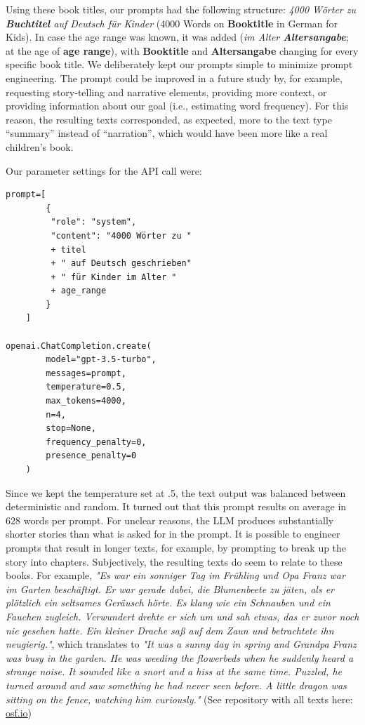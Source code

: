 \documentclass[doc, a4paper]{apa7}
\begin{document}
Using these book titles, our prompts had the following structure: \textit{4000 Wörter zu \textbf{Buchtitel} auf Deutsch für Kinder} (4000 Words on \textbf{Booktitle} in German for Kids). In case the age range was known, it was added (\textit{im Alter \textbf{Altersangabe}}; at the age of \textbf{age range}), with \textbf{Booktitle} and \textbf{Altersangabe} changing for every specific book title. We deliberately kept our prompts simple to minimize prompt engineering. The prompt could be improved in a future study by, for example, requesting story-telling and narrative elements, providing more context, or providing information about our goal (i.e., estimating word frequency). For this reason, the resulting texts corresponded, as expected, more to the text type “summary” instead of “narration”, which would have been more like a real children’s book.

Our parameter settings for the API call were:  

\begin{verbatim}
prompt=[
        {
         "role": "system", 
         "content": "4000 Wörter zu "
         + titel 
         + " auf Deutsch geschrieben" 
         + " für Kinder im Alter "
         + age_range
        }
    ]

openai.ChatCompletion.create(
        model="gpt-3.5-turbo",  
        messages=prompt,
        temperature=0.5,
        max_tokens=4000,
        n=4,
        stop=None,
        frequency_penalty=0,
        presence_penalty=0
    )
\end{verbatim}


Since we kept the temperature set at .5, the text output was balanced between deterministic and random. It turned out that this prompt results on average in 628 words per prompt. For unclear reasons, the LLM produces substantially shorter stories than what is asked for in the prompt. It is possible to engineer prompts that result in longer texts, for example, by prompting to break up the story into chapters. Subjectively, the resulting texts do seem to relate to these books. For example, \textit{"Es war ein sonniger Tag im Frühling und Opa Franz war im Garten beschäftigt. Er war gerade dabei, die Blumenbeete zu jäten, als er plötzlich ein seltsames Geräusch hörte. Es klang wie ein Schnauben und ein Fauchen zugleich. Verwundert drehte er sich um und sah etwas, das er zuvor noch nie gesehen hatte. Ein kleiner Drache saß auf dem Zaun und betrachtete ihn neugierig."}, which translates to \textit{"It was a sunny day in spring and Grandpa Franz was busy in the garden. He was weeding the flowerbeds when he suddenly heard a strange noise. It sounded like a snort and a hiss at the same time. Puzzled, he turned around and saw something he had never seen before. A little dragon was sitting on the fence, watching him curiously."} (See repository with all texts here: \href{https://osf.io/wmuvj/?view_only=06ba6b0ec23248df8a1418add4da05a0}{osf.io})
\end{document}
